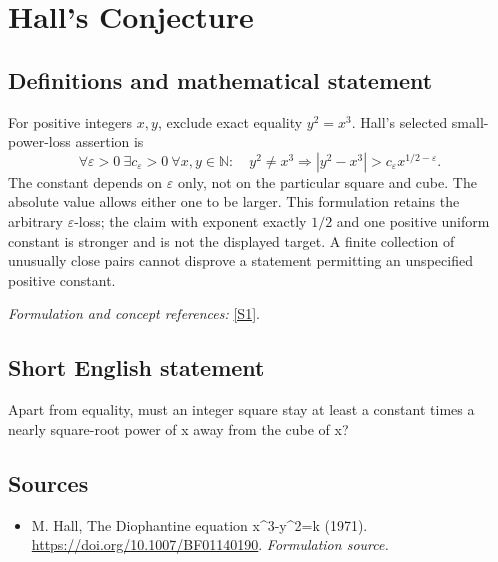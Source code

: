 \documentclass[11pt]{article}
\begin{document}
\section*{\texorpdfstring{Hall's Conjecture}{Hall's Conjecture}}\label{statement}
\subsection{Definitions and mathematical statement}
For positive integers $x,y$, exclude exact equality $y^2=x^3$. Hall's selected small-power-loss assertion is
\[
 \forall{\varepsilon}>0\ \exists c_{\varepsilon}>0\ \forall x,y\in{\mathbb{N}}:\quad
 y^2\ne x^3\Longrightarrow
 |y^2-x^3|>c_{\varepsilon} x^{1/2-{\varepsilon}}.
\]
The constant depends on ${\varepsilon}$ only, not on the particular square and cube. The absolute value allows either one to be larger. This formulation retains the arbitrary ${\varepsilon}$-loss; the claim with exponent exactly $1/2$ and one positive uniform constant is stronger and is not the displayed target. A finite collection of unusually close pairs cannot disprove a statement permitting an unspecified positive constant.
\par\smallskip\textit{Formulation and concept references:} \href{https://doi.org/10.1007/BF01140190}{[S1]}.

\subsection{Short English statement}
Apart from equality, must an integer square stay at least a constant times a nearly square-root power of x away from the cube of x?
\subsection{Sources}
\begin{itemize}
\item[S1]M. Hall, The Diophantine equation x\textasciicircum{}3-y\textasciicircum{}2=k (1971).
\url{https://doi.org/10.1007/BF01140190}.
\textit{Formulation source.}
\end{itemize}
\end{document}
